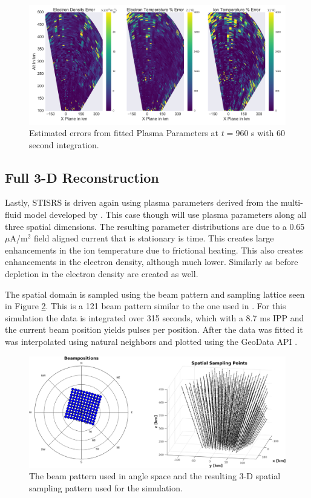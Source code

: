 \documentclass[draft,ras]{agutex}
\begin{document}
\begin{article}
\begin{figure}[!t]
\centering
\includegraphics[width=6in]{0960_60_int_err}
\caption{Estimated errors from fitted Plasma Parameters at $t=960$ s with 60 second integration.}
\label{fig:fplparamst60err}
\end{figure}

\subsection{Full 3-D Reconstruction}

Lastly, STISRS is driven again using plasma parameters derived from the multi-fluid model developed by \cite{semeter:plasmatransport2012}. This case though will use plasma parameters along all three spatial dimensions. The resulting parameter distributions are due to a 0.65 $\mu$A/m$^2$ field aligned current that is stationary is time. This creates large enhancements in the ion temperature due to frictional heating. This also creates enhancements in the electron density, although much lower. Similarly as before depletion in the electron density are created as well.

The spatial domain is sampled using the beam pattern and sampling lattice seen in Figure \ref{fig:3dsampling}. This is a 121 beam pattern similar to the one used in \cite{Semeter:2008hs}. For this simulation the data is integrated over 315 seconds, which with a 8.7 ms IPP and the current beam position yields pulses per position. After the data was fitted it was interpolated using natural neighbors and plotted using the GeoData API \cite{john_swoboda_2016_154536}.

\begin{figure}[!t]
\centering
\includegraphics[width=6in]{Sampling3d}
\caption{The beam pattern used in angle space and the resulting 3-D spatial sampling pattern used for the simulation.}
\label{fig:3dsampling}
\end{figure}


\end{article}
\end{document}
